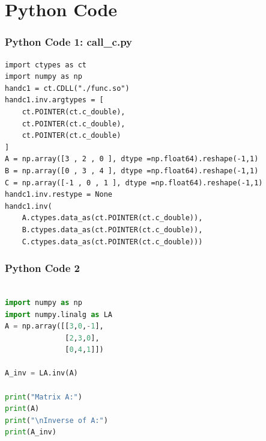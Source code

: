 \documentclass{beamer}
\theoremstyle{remark}
\numberwithin{equation}{section}
\begin{document}
\section{Python Code}
\begin{frame}[fragile]
\frametitle{Python Code 1: call\_c.py}
\begin{lstlisting}
import ctypes as ct
import numpy as np
handc1 = ct.CDLL("./func.so")
handc1.inv.argtypes = [
    ct.POINTER(ct.c_double),
    ct.POINTER(ct.c_double),
    ct.POINTER(ct.c_double)
]
A = np.array([3 , 2 , 0 ], dtype =np.float64).reshape(-1,1)
B = np.array([0 , 3 , 4 ], dtype =np.float64).reshape(-1,1)
C = np.array([-1 , 0 , 1 ], dtype =np.float64).reshape(-1,1)
handc1.inv.restype = None
handc1.inv(
    A.ctypes.data_as(ct.POINTER(ct.c_double)),
    B.ctypes.data_as(ct.POINTER(ct.c_double)),
    C.ctypes.data_as(ct.POINTER(ct.c_double)))
\end{lstlisting}
\end{frame}

\begin{frame}[fragile]
\frametitle{Python Code 2}
\begin{lstlisting}[language=Python]

import numpy as np
import numpy.linalg as LA
A = np.array([[3,0,-1],
              [2,3,0],
              [0,4,1]])

A_inv = LA.inv(A)

print("Matrix A:")
print(A)
print("\nInverse of A:")
print(A_inv)


\end{lstlisting}
\end{frame}
\end{document}
